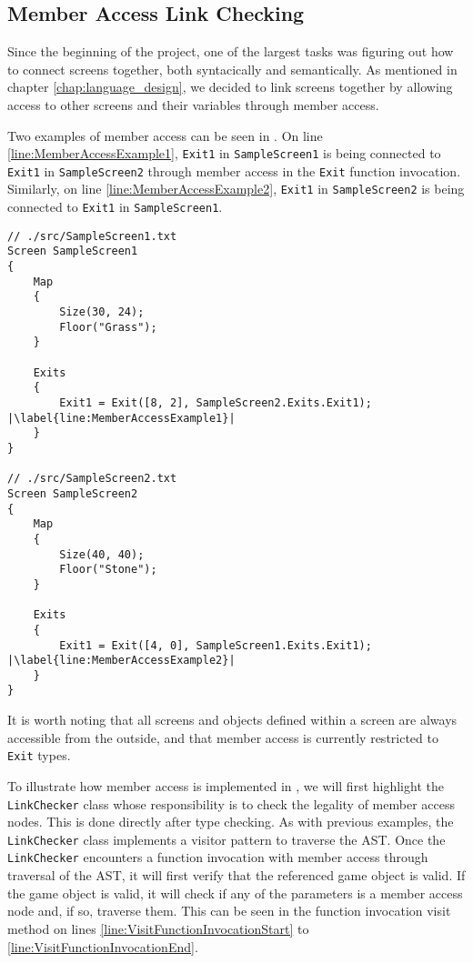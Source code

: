 \subsection*{Member Access Link Checking} \label{sec:Linker}
Since the beginning of the project, one of the largest tasks was figuring out how to connect screens together, both syntacically and semantically. 
As mentioned in chapter \ref{chap:language_design}, we decided to link screens together by allowing access to other screens and their variables through member access. 


Two examples of member access can be seen in . 
On line \ref{line:MemberAccessExample1}, \texttt{Exit1} in \texttt{SampleScreen1} is being connected to \texttt{Exit1} in \texttt{SampleScreen2} through member access in the \texttt{Exit} function invocation.
Similarly, on line \ref{line:MemberAccessExample2}, \texttt{Exit1} in \texttt{SampleScreen2} is being connected to \texttt{Exit1} in \texttt{SampleScreen1}.

\begin{lstlisting}[language=CSharp, caption={\dazel{} source code example of member access.}, label={lst:LinkingExample},escapechar=|]
// ./src/SampleScreen1.txt
Screen SampleScreen1 
{
	Map 
	{
		Size(30, 24);
		Floor("Grass");
	}
	
	Exits 
	{
		Exit1 = Exit([8, 2], SampleScreen2.Exits.Exit1); |\label{line:MemberAccessExample1}|
	}
}

// ./src/SampleScreen2.txt
Screen SampleScreen2
{
	Map 
	{
		Size(40, 40);
		Floor("Stone");
	}
	
	Exits 
	{
		Exit1 = Exit([4, 0], SampleScreen1.Exits.Exit1); |\label{line:MemberAccessExample2}|
	}
}
\end{lstlisting}

It is worth noting that all screens and objects defined within a screen are always accessible from the outside, and that member access is currently restricted to \texttt{Exit} types.


To illustrate how member access is implemented in \dazel{}, we will first highlight the \texttt{LinkChecker} class whose responsibility is to check the legality of member access nodes. This is done directly after type checking.
As with previous examples, the \texttt{LinkChecker} class implements a visitor pattern to traverse the AST.
Once the \texttt{LinkChecker} encounters a function invocation with member access through traversal of the AST, it will first verify that the referenced game object is valid. 
If the game object is valid, it will check if any of the parameters is a member access node and, if so, traverse them. This can be seen in the function invocation visit method on lines \ref{line:VisitFunctionInvocationStart} to \ref{line:VisitFunctionInvocationEnd}. 

